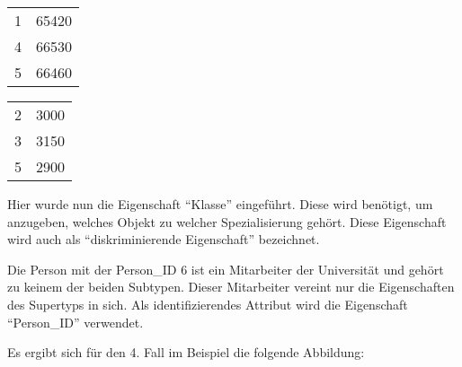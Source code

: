           \begin{supertabular}[h]{lp{5cm}}
            1 & 65420\\
            4 & 66530\\
            5 & 66460\\
          \end{supertabular}
          \begin{supertabular}[h]{lp{5cm}}
            2 & 3000\\
            3 & 3150\\
            5 & 2900\\
          \end{supertabular}

          Hier wurde nun die Eigenschaft \enquote{Klasse} eingeführt. Diese wird benötigt, um anzugeben, welches Objekt zu welcher Spezialisierung gehört. Diese Eigenschaft wird auch als \enquote{diskriminierende Eigenschaft} bezeichnet.

          Die Person mit der Person\_ID 6 ist ein Mitarbeiter der Universität und gehört zu keinem der beiden Subtypen. Dieser Mitarbeiter vereint nur die Eigenschaften des Supertyps in sich. Als identifizierendes Attribut wird die Eigenschaft \enquote{Person\_ID} verwendet.

          Es ergibt sich für den 4. Fall im Beispiel die folgende Abbildung:

          \begin{center}
          \end{center}

